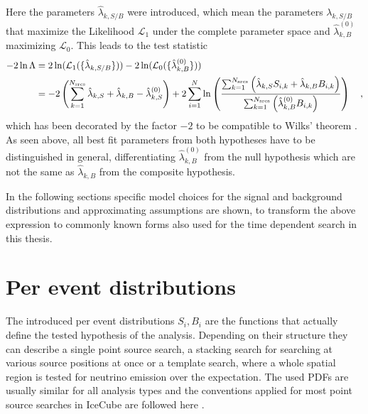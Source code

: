 Here the parameters $\hat{\lambda}_{k,S/B}$ were introduced, which mean the parameters $\lambda_{k,S/B}$ that maximize the Likelihood $\mathcal{L}_1$ under the complete parameter space and $\hat{\lambda}_{k,B}^{(0)}$ maximizing $\mathcal{L}_0$.
This leads to the test statistic
\begin{equation}
  \begin{aligned}
    -2\ln\Lambda
    &= 2\ln(\mathcal{L}_1(\{\hat{\lambda}_{k,S/B}\})) -
       2\ln(\mathcal{L}_0(\{\hat{\lambda}^{(0)}_{k,B}\})) \\
    &= -2\left(\sum_{k=1}^{N_\text{srcs}}\hat{\lambda}_{k,S} +
                                         \hat{\lambda}_{k,B} -
                                         \hat{\lambda}_{k,S}^{(0)}\right) +
      2\sum_{i=1}^N \ln\left(
        \frac{\sum_{k=1}^{N_\text{srcs}}\left(
            \hat{\lambda}_{k,S} S_{i,k}+\hat{\lambda}_{k,B} B_{i,k}\right)}
            {\sum_{k=1}^{N_\text{srcs}}\left(
              \hat{\lambda}_{k,B}^{(0)} B_{i,k}
            \right)}
          \right)
    \quad\text{,}
  \end{aligned}
\end{equation}
which has been decorated by the factor $-2$ to be compatible to Wilks' theorem .
As seen above, all best fit parameters from both hypotheses have to be distinguished in general, differentiating $\hat{\lambda}_{k,B}^{(0)}$ from the null hypothesis which are not the same as $\hat{\lambda}_{k,B}$ from the composite hypothesis.

In the following sections specific model choices for the signal and background distributions and approximating assumptions are shown, to transform the above expression to commonly known forms also used for the time dependent search in this thesis.


\section{Per event distributions}
The introduced per event distributions $S_i, B_i$ are the functions that actually define the tested hypothesis of the analysis.
Depending on their structure they can describe a single point source search, a stacking search for searching at various source positions at once or a template search, where a whole spatial region is tested for neutrino emission over the expectation.
The used PDFs are usually similar for all analysis types and the conventions applied for most point source searches in IceCube are followed here .

